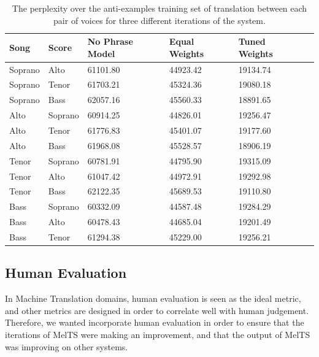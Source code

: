 \documentclass{sig-alternate}
\begin{document}
\begin{table}[t]
      \begin{tabular}{| l | l | l | l | l | l |}
      \hline
     Song & Score & No Phrase Model & Equal Weights & Tuned Weights \\ \hline
     Soprano & Alto & 61101.80 & 44923.42 & 19134.74 \\ 
     Soprano & Tenor & 61703.21 & 45324.36 & 19080.18 \\ 
     Soprano & Bass & 62057.16 & 45560.33 & 18891.65 \\ 
     Alto & Soprano & 60914.25 & 44826.01 & 19256.47 \\ 
     Alto & Tenor & 61776.83 & 45401.07 & 19177.60 \\ 
     Alto & Bass & 61968.08 & 45528.57 & 18906.19 \\ 
     Tenor & Soprano & 60781.91 & 44795.90 & 19315.09 \\ 
     Tenor & Alto & 61047.42 & 44972.91 & 19292.98 \\ 
     Tenor & Bass & 62122.35 & 45689.53 & 19110.80 \\ 
     Bass & Soprano & 60332.09 & 44587.48 & 19284.29 \\ 
     Bass & Alto & 60478.43 & 44685.04 & 19201.49 \\ 
     Bass & Tenor & 61294.38 & 45229.00 & 19256.21 \\ \hline
        \end{tabular}
  \caption{The perplexity over the anti-examples training set of translation between each pair of voices for three different iterations of the system.}
\end{table}

\subsection{Human Evaluation}
In Machine Translation domains, human evaluation is seen as the ideal metric, and other metrics are designed in order to correlate well with human judgement. Therefore, we wanted incorporate human evaluation in order to ensure that the iterations of MelTS were making an improvement, and that the output of MelTS was improving on other systems.
\end{document}
